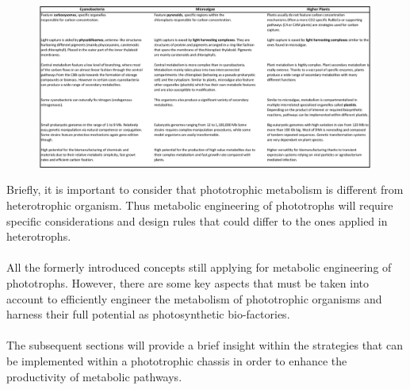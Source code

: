 \begin{figure}[!htpb]
    \centering
    \includegraphics[angle=-90, scale=0.2]{images/chap7/table_met_eng.jpg}
    \label{fig:chp7landscapetable}
\end{figure}
\FloatBarrier
\noindent
Briefly, it is important to consider that phototrophic metabolism is different from heterotrophic organism. Thus metabolic engineering of phototrophs will require specific considerations and design rules that could differ to the ones applied in heterotrophs. \\ \\
All the formerly introduced concepts still applying for metabolic engineering of phototrophs. However, there are some key aspects that must be taken into account to efficiently engineer the metabolism of phototrophic organisms and harness their full potential as photosynthetic bio-factories. \\ \\
The subsequent sections will provide a brief insight within the strategies that can be implemented within a phototrophic chassis in order to enhance the productivity of metabolic pathways.
